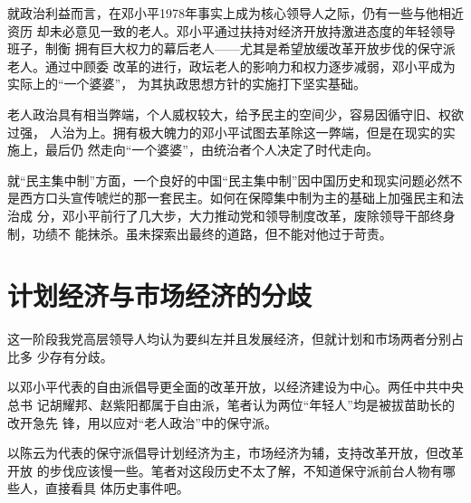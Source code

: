 就政治利益而言，在邓小平1978年事实上成为核心领导人之际，仍有一些与他相近资历
却未必意见一致的老人。邓小平通过扶持对经济开放持激进态度的年轻领导班子，制衡
拥有巨大权力的幕后老人——尤其是希望放缓改革开放步伐的保守派老人。通过中顾委
改革的进行，政坛老人的影响力和权力逐步减弱，邓小平成为实际上的“一个婆婆”，
为其执政思想方针的实施打下坚实基础。

老人政治具有相当弊端，个人威权较大，给予民主的空间少，容易因循守旧、权欲过强，
人治为上。拥有极大魄力的邓小平试图去革除这一弊端，但是在现实的实施上，最后仍
然走向“一个婆婆”，由统治者个人决定了时代走向。

就“民主集中制”方面，一个良好的中国“民主集中制”因中国历史和现实问题必然不
是西方口头宣传唬烂的那一套民主。如何在保障集中制为主的基础上加强民主和法治成
分，邓小平前行了几大步，大力推动党和领导制度改革，废除领导干部终身制，功绩不
能抹杀。虽未探索出最终的道路，但不能对他过于苛责。

\section{计划经济与市场经济的分歧}



这一阶段我党高层领导人均认为要纠左并且发展经济，但就计划和市场两者分别占比多
少存有分歧。

以邓小平代表的自由派倡导更全面的改革开放，以经济建设为中心。两任中共中央总书
记胡耀邦、赵紫阳都属于自由派，笔者认为两位“年轻人”均是被拔苗助长的改开急先
锋，用以应对“老人政治”中的保守派。

以陈云为代表的保守派倡导计划经济为主，市场经济为辅，支持改革开放，但改革开放
的步伐应该慢一些。笔者对这段历史不太了解，不知道保守派前台人物有哪些人，直接看具
体历史事件吧。

